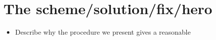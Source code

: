 \section{The scheme/solution/fix/hero}


\begin{itemize}
    \item Describe why the procedure we present gives a reasonable
\end{itemize}
